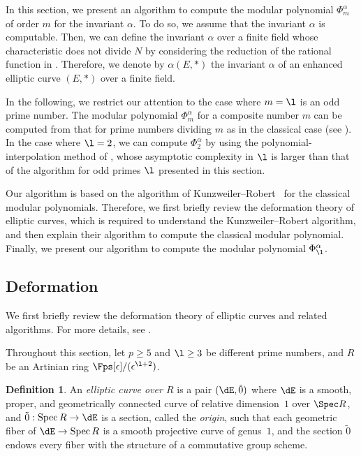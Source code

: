 \documentclass{amsart}
\theoremstyle{definition}
\newtheorem{definition}[theorem]{Definition}
\theoremstyle{remark}
\numberwithin{equation}{section}
\begin{document}
In this section, we present an algorithm to compute
the modular polynomial $\Phi_{m}^{\alpha}$ of order $m$ for the invariant $\alpha$.
To do so, we assume that the invariant $\alpha$ is computable.
Then,
we can define the invariant $\alpha$ over a finite field whose characteristic does not divide $N$
by considering the reduction of the rational function in .
Therefore, we denote by $\alpha(E, *)$
the invariant $\alpha$ of an enhanced elliptic curve $(E, *)$ over a finite field.

In the following, we restrict our attention to the case where $m=\l$ is an odd prime number.
The modular polynomial $\Phi_m^\alpha$ for a composite number $m$ can be computed from
that for prime numbers dividing $m$ as in the classical case (see \cite[\S 69]{Weber1908}).
In the case where $\l=2$,
we can compute $\Phi_2^\alpha$ by using
the polynomial-interpolation method of \cite{CL2005modular},
whose asymptotic complexity in $\l$ is larger than that of
the algorithm for odd primes $\l$ presented in this section.

Our algorithm is based on the algorithm of Kunzweiler--Robert~\cite{deformation_Kunzweiler_2024}
for the classical modular polynomials.
Therefore,
we first briefly review the deformation theory of elliptic curves,
which is required to understand the Kunzweiler--Robert algorithm,
and then explain their algorithm to compute the classical modular polynomial.
Finally, we present our algorithm to compute the modular polynomial $\Phi_{\l}^{\alpha}$.

\subsection{Deformation}\label{subsec:deformation}

We first briefly review the deformation theory of elliptic curves and related algorithms. 
For more details, see \cite{deformation_Kunzweiler_2024}.

Throughout this section, 
let $p\ge 5$ and $\l\ge 3$ be different prime numbers,
and $R$ be an Artinian ring $\Fps[\epsilon]/(\epsilon^{\l+2})$.  

\begin{definition}  
    An \emph{elliptic curve over $R$} is a pair $(\dE,\tilde{0})$ where $\dE$ is a smooth,
    proper, and geometrically connected curve of relative dimension~$1$ over
    $\Spec R$, and 
    $\tilde{0} : \operatorname{Spec}R \to \dE$
    is a section, called the \emph{origin}, such that each geometric fiber of
    $\dE \to \operatorname{Spec}R$ is a smooth projective curve of genus~$1$, and the
    section $\tilde{0}$ endows every fiber with the structure of a commutative group
    scheme.
\end{definition}
\end{document}
